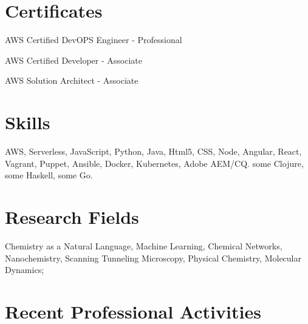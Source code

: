 \documentclass[11pt,letterpaper]{article}
\renewenvironment{itemize}{
  \begin{list}{}{
    \setlength{\leftmargin}{1.5em}
  }
}{
  \end{list}
}
\begin{document}
\section*{Certificates}
\begin{itemize}
  \item  AWS Certified DevOPS Engineer - Professional
  \item  AWS Certified Developer - Associate
  \item  AWS Solution Architect - Associate
\end{itemize}


\section*{Skills}

\begin{itemize}
  \item  AWS, Serverless, JavaScript, Python, Java, Html5, CSS, Node, Angular, React, Vagrant, Puppet, Ansible, Docker, Kubernetes, Adobe AEM/CQ. some Clojure, some Haskell, some Go.
\end{itemize}

\section*{Research Fields}
Chemistry as a Natural Language, Machine Learning, Chemical Networks, Nanochemistry, Scanning Tunneling Microscopy, Physical Chemistry, Molecular Dynamics;


\section*{Recent Professional Activities}
\end{document}
